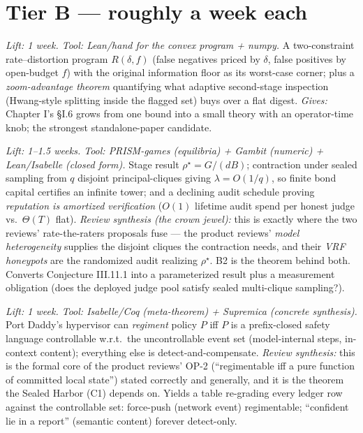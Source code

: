 \documentclass[11pt,a4paper]{article}
\begin{document}
\section{Tier B --- roughly a week each}
\begin{description}[leftmargin=0em,style=unboxed]
\item[B1. The digest--zoom Pareto frontier.] \emph{Lift: 1 week. Tool: Lean/hand for the convex program + numpy.} A two-constraint rate--distortion program $R(\delta,f)$ (false negatives priced by $\delta$, false positives by open-budget $f$) with the original information floor as its worst-case corner; plus a \emph{zoom-advantage theorem} quantifying what adaptive second-stage inspection (Hwang-style splitting inside the flagged set) buys over a flat digest. \emph{Gives:} Chapter I's \S I.6 grows from one bound into a small theory with an operator-time knob; the strongest standalone-paper candidate.

\item[B2. The inspection tower.] \emph{Lift: 1--1.5 weeks. Tool: PRISM-games (equilibria) + Gambit (numeric) + Lean/Isabelle (closed form).} Stage result $\rho^\star=G/(dB)$; contraction under sealed sampling from $q$ disjoint principal-cliques giving $\lambda=O(1/q)$, so finite bond capital certifies an infinite tower; and a declining audit schedule proving \emph{reputation is amortized verification} ($O(1)$ lifetime audit spend per honest judge vs.\ $\Theta(T)$ flat). \emph{Review synthesis (the crown jewel):} this is exactly where the two reviews' rate-the-raters proposals fuse --- the product reviews' \emph{model heterogeneity} supplies the disjoint cliques the contraction needs, and their \emph{VRF honeypots} are the randomized audit realizing $\rho^\star$. B2 is the theorem behind both. Converts Conjecture III.11.1 into a parameterized result plus a measurement obligation (does the deployed judge pool satisfy sealed multi-clique sampling?).

\item[B3. Hypervisor enforceability = Ramadge--Wonham controllability.] \emph{Lift: 1 week. Tool: Isabelle/Coq (meta-theorem) + Supremica (concrete synthesis).} Port Daddy's hypervisor can \emph{regiment} policy $P$ iff $P$ is a prefix-closed safety language controllable w.r.t.\ the uncontrollable event set (model-internal steps, in-context content); everything else is detect-and-compensate. \emph{Review synthesis:} this is the formal core of the product reviews' OP-2 (``regimentable iff a pure function of committed local state'') stated correctly and generally, and it is the theorem the Sealed Harbor (C1) depends on. Yields a table re-grading every ledger row against the controllable set: force-push (network event) regimentable; ``confident lie in a report'' (semantic content) forever detect-only.


\end{description}
\end{document}
